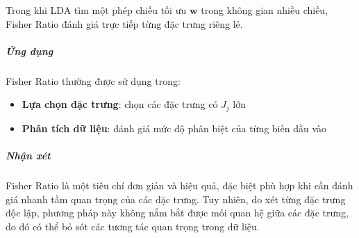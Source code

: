 Trong khi LDA tìm một phép chiếu tối ưu $\boldsymbol{w}$ trong không gian nhiều
chiều, Fisher Ratio đánh giá trực tiếp từng đặc trưng riêng lẻ.

\subparagraph{Ứng dụng}
Fisher Ratio thường được sử dụng trong:
\begin{itemize}
  \item \textbf{Lựa chọn đặc trưng}: chọn các đặc trưng có $J_j$ lớn
  \item \textbf{Phân tích dữ liệu}: đánh giá mức độ phân biệt của từng biến đầu vào
\end{itemize}

\subparagraph{Nhận xét}
Fisher Ratio là một tiêu chí đơn giản và hiệu quả, đặc biệt phù hợp khi cần
đánh giá nhanh tầm quan trọng của các đặc trưng. Tuy nhiên, do xét từng đặc
trưng độc lập, phương pháp này không nắm bắt được mối quan hệ giữa các đặc
trưng, do đó có thể bỏ sót các tương tác quan trọng trong dữ liệu.
